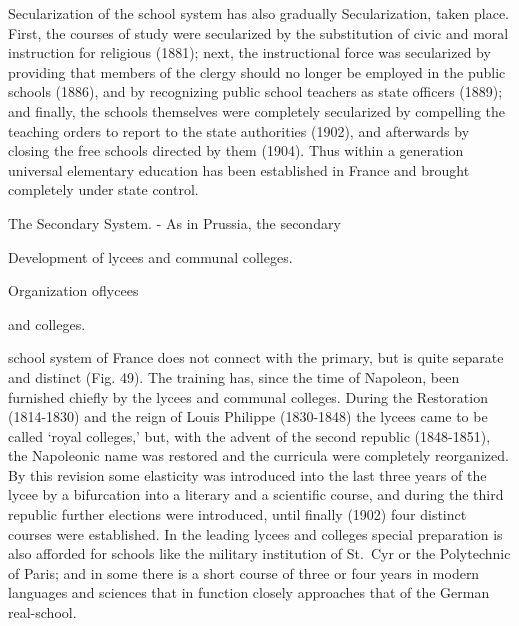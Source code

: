 \documentclass[]{book}
\begin{document}
Secularization of the school system has also gradually Secularization, taken place. First, the courses of study were secularized by the substitution of civic and moral instruction for religious (1881); next, the instructional force was secularized by providing that members of the clergy should no longer be employed in the public schools (1886), and by recognizing public school teachers as state officers (1889); and finally, the schools themselves were completely secularized by compelling the teaching orders to report to the state authorities (1902), and afterwards by closing the free schools directed by them (1904). Thus within a generation universal elementary education has been established in France and brought completely under state control.

The Secondary System. - As in Prussia, the secondary

Development of lycees and communal colleges.

Organization oflycees

and colleges.

school system of France does not connect with the primary, but is quite separate and distinct (Fig. 49). The training has, since the time of Napoleon, been furnished chiefly by the lycees and communal colleges. During the Restoration (1814-1830) and the reign of Louis Philippe (1830-1848) the lycees came to be called `royal colleges,' but, with the advent of the second republic (1848-1851), the Napoleonic name was restored and the curricula were completely reorganized. By this revision some elasticity was introduced into the last three years of the lycee by a bifurcation into a literary and a scientific course, and during the third republic further elections were introduced, until finally (1902) four distinct courses were established. In the leading lycees and colleges special preparation is also afforded for schools like the military institution of St.~Cyr or the Polytechnic of Paris; and in some there is a short course of three or four years in modern languages and sciences that in function closely approaches that of the German real-school.
\end{document}
